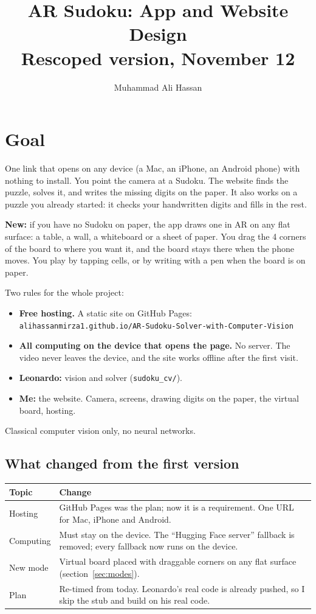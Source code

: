 \documentclass[11pt]{article}
\title{AR Sudoku: App and Website Design\\\large Rescoped version, November 12}
\author{Muhammad Ali Hassan}
\date{}
\begin{document}
\maketitle

\section{Goal}

One link that opens on any device (a Mac, an iPhone, an Android phone) with nothing to install. You
point the camera at a Sudoku. The website finds the puzzle, solves it, and writes the missing
digits on the paper. It also works on a puzzle you already started: it checks your handwritten
digits and fills in the rest.

\textbf{New:} if you have no Sudoku on paper, the app draws one in AR on any flat surface: a table,
a wall, a whiteboard or a sheet of paper. You drag the 4 corners of the board to where you want
it, and the board stays there when the phone moves. You play by tapping cells, or by writing with a
pen when the board is on paper.

Two rules for the whole project:
\begin{itemize}
  \item \textbf{Free hosting.} A static site on GitHub Pages:\\
        \texttt{alihassanmirza1.github.io/AR-Sudoku-Solver-with-Computer-Vision}
  \item \textbf{All computing on the device that opens the page.} No server. The video never leaves
        the device, and the site works offline after the first visit.
\end{itemize}
\begin{itemize}
  \item \textbf{Leonardo:} vision and solver (\texttt{sudoku\_cv/}).
  \item \textbf{Me:} the website. Camera, screens, drawing digits on the paper, the virtual board,
        hosting.
\end{itemize}
Classical computer vision only, no neural networks.

\subsection*{What changed from the first version}

\begin{tabularx}{\textwidth}{@{}l>{\raggedright\arraybackslash}X@{}}
\toprule
Topic & Change \\
\midrule
Hosting & GitHub Pages was the plan; now it is a requirement. One URL for Mac, iPhone and Android. \\
Computing & Must stay on the device. The ``Hugging Face server'' fallback is removed; every
  fallback now runs on the device. \\
New mode & Virtual board placed with draggable corners on any flat surface
  (section~\ref{sec:modes}). \\
Plan & Re-timed from today. Leonardo's real code is already pushed, so I skip the stub and build
  on his real code. \\
\bottomrule
\end{tabularx}
\end{document}
